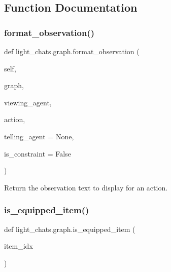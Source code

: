 \subsection{Function Documentation}
\mbox{\label{namespacelight__chats_1_1graph_a6d359942394976812f0055affc289f56}} 
\subsubsection{\texorpdfstring{format\+\_\+observation()}{format\_observation()}}
{\footnotesize\ttfamily def light\+\_\+chats.\+graph.\+format\+\_\+observation (\begin{DoxyParamCaption}\item[{}]{self,  }\item[{}]{graph,  }\item[{}]{viewing\+\_\+agent,  }\item[{}]{action,  }\item[{}]{telling\+\_\+agent = {\ttfamily None},  }\item[{}]{is\+\_\+constraint = {\ttfamily False} }\end{DoxyParamCaption})}

\begin{DoxyVerb}Return the observation text to display for an action.
\end{DoxyVerb}
 \mbox{\label{namespacelight__chats_1_1graph_a76960b89046df1b0cda1de931fa1fd69}} 
\subsubsection{\texorpdfstring{is\+\_\+equipped\+\_\+item()}{is\_equipped\_item()}}
{\footnotesize\ttfamily def light\+\_\+chats.\+graph.\+is\+\_\+equipped\+\_\+item (\begin{DoxyParamCaption}\item[{}]{item\+\_\+idx }\end{DoxyParamCaption})}

